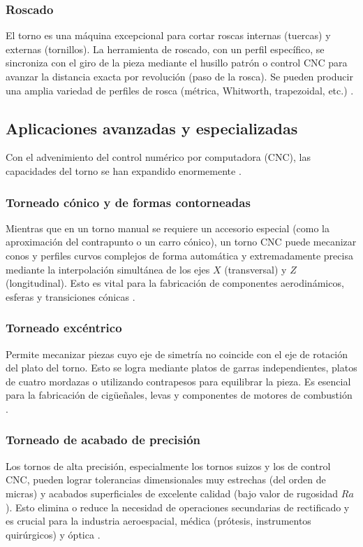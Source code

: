 \documentclass[12pt,a4paper]{article}
\begin{document}
\subsubsection{Roscado}
El torno es una máquina excepcional para cortar roscas internas (tuercas) y externas (tornillos). La herramienta de roscado, con un perfil específico, se sincroniza con el giro de la pieza mediante el husillo patrón o control CNC para avanzar la distancia exacta por revolución (paso de la rosca). Se pueden producir una amplia variedad de perfiles de rosca (métrica, Whitworth, trapezoidal, etc.) \cite{torno_protocolo, groover2020}.

\subsection{Aplicaciones avanzadas y especializadas}
Con el advenimiento del control numérico por computadora (CNC), las capacidades del torno se han expandido enormemente \cite{torno_protocolo, altintas2012}.

\subsubsection{Torneado cónico y de formas contorneadas}
Mientras que en un torno manual se requiere un accesorio especial (como la aproximación del contrapunto o un carro cónico), un torno CNC puede mecanizar conos y perfiles curvos complejos de forma automática y extremadamente precisa mediante la interpolación simultánea de los ejes $X$ (transversal) y $Z$ (longitudinal). Esto es vital para la fabricación de componentes aerodinámicos, esferas y transiciones cónicas \cite{altintas2012}.

\subsubsection{Torneado excéntrico}
Permite mecanizar piezas cuyo eje de simetría no coincide con el eje de rotación del plato del torno. Esto se logra mediante platos de garras independientes, platos de cuatro mordazas o utilizando contrapesos para equilibrar la pieza. Es esencial para la fabricación de cigüeñales, levas y componentes de motores de combustión \cite{chapman2006, quintero2018}.

\subsubsection{Torneado de acabado de precisión}
Los tornos de alta precisión, especialmente los tornos suizos y los de control CNC, pueden lograr tolerancias dimensionales muy estrechas (del orden de micras) y acabados superficiales de excelente calidad (bajo valor de rugosidad $Ra$). Esto elimina o reduce la necesidad de operaciones secundarias de rectificado y es crucial para la industria aeroespacial, médica (prótesis, instrumentos quirúrgicos) y óptica \cite{torno_protocolo, degarmo2011}.
\end{document}
